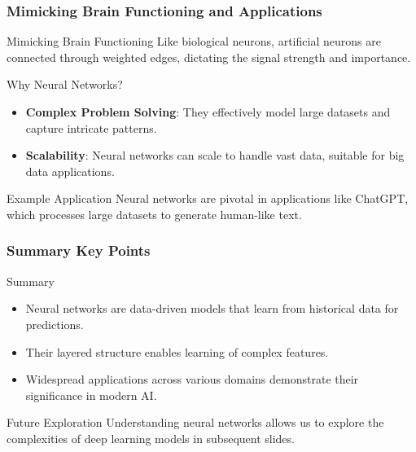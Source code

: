 \documentclass[aspectratio=169]{beamer}
\begin{document}
\begin{frame}[fragile]
    \frametitle{Mimicking Brain Functioning and Applications}
    \begin{block}{Mimicking Brain Functioning}
        Like biological neurons, artificial neurons are connected through weighted edges, dictating the signal strength and importance.
    \end{block}
    
    \begin{block}{Why Neural Networks?}
        \begin{itemize}
            \item \textbf{Complex Problem Solving}: They effectively model large datasets and capture intricate patterns.
            \item \textbf{Scalability}: Neural networks can scale to handle vast data, suitable for big data applications.
        \end{itemize}
    \end{block}
    
    \begin{block}{Example Application}
        Neural networks are pivotal in applications like ChatGPT, which processes large datasets to generate human-like text.
    \end{block}
\end{frame}

\begin{frame}[fragile]
    \frametitle{Summary Key Points}
    \begin{block}{Summary}
        \begin{itemize}
            \item Neural networks are data-driven models that learn from historical data for predictions.
            \item Their layered structure enables learning of complex features.
            \item Widespread applications across various domains demonstrate their significance in modern AI.
        \end{itemize}
    \end{block}
    
    \begin{block}{Future Exploration}
        Understanding neural networks allows us to explore the complexities of deep learning models in subsequent slides.
    \end{block}
\end{frame}
\end{document}
